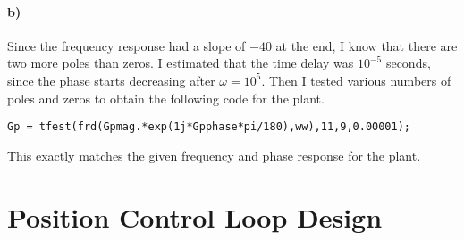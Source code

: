 \documentclass[12pt]{article}
\begin{document}
\paragraph{b)}

Since the frequency response had a slope of \(-40\) at the end, I know that there are two more poles than zeros.
I estimated that the time delay was \(10^{-5}\) seconds, since the phase starts decreasing after \(\omega=10^5\).
Then I tested various numbers of poles and zeros to obtain the following code for the plant.
\begin{verbatim}
Gp = tfest(frd(Gpmag.*exp(1j*Gpphase*pi/180),ww),11,9,0.00001);
\end{verbatim}
This exactly matches the given frequency and phase response for the plant.

\section{Position Control Loop Design}
\end{document}
